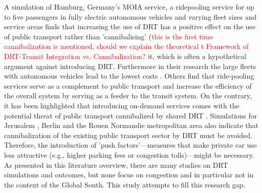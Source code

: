 \documentclass[main.tex]{subfiles}
\begin{document}
A  simulation of Hamburg, Germany's MOIA service, a ridepooling service for up to five passengers in fully electric autonomous vehicles and varying fleet sizes and service areas \citep{KagerbauerKostorzWilkes2021_1000141282} finds that increasing the use of DRT has a positive effect on the use of public transport rather than 'cannibalising' (\textcolor{red}{this is the first time cannibalization is mentioned, should we explain the theoretical t Framework of DRT-Transit Integration vs. Cannibalization?} it, which is often a hypothetical argument against introducing DRT. Furthermore in their research the large fleets with autonomous vehicles lead to the lowest costs \citep{KagerbauerKostorzWilkes2021_1000141282}. Others \cite{Basu.2018} find that ride-pooling services serve as a complement to public transport and increase the efficiency of the overall system by serving as a feeder to the transit system. On the contrary, it has been highlighted that introducing on-demand services comes with the potential threat of public transport cannibalized by shared DRT \cite{Oh.2020}. Simulations for Jerusalem \cite{BenDor.2022}, Berlin \cite{Kaddoura.2020} and the Rouen Normandie metropolitan area \cite{Vosooghi.2019} also indicate that cannibalization of the existing public transport sector by DRT must be avoided. Therefore, the introduction of 'push factors'—measures that make private car use less attractive (e.g., higher parking fees or congestion tolls)—might be necessary. As presented in this literature overview, there are many studies on DRT simulations and outcomes, but none focus on congestion and in particular not in the context of the Global South. This study attempts to fill this research gap.

\end{document}
